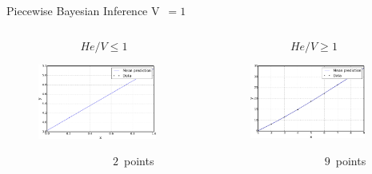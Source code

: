 \documentclass[10pt]{beamer}
\begin{document}
\begin{frame}{Piecewise Bayesian Inference V~$= 1$}
  	\begin{columns}[onlytextwith]
    	\begin{column}{0.5\textwidth}
    	$$He/V \leq 1$$
      		\begin{figure}
        		\includegraphics[width=0.9\textwidth]{low1Result}
      		\end{figure}
      		~~~~~~~~~~~~~~~~~~~$2$~points
    	\end{column}  
    	\begin{column}{0.5\textwidth}
    	$$He/V \geq 1$$
      		\begin{figure}
        		\includegraphics[width=0.9\textwidth]{high1Result}
      		\end{figure}
      		~~~~~~~~~~~~~~~~~~~$9$~points
    	\end{column}
  	\end{columns}
\end{frame}
\end{document}
